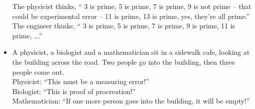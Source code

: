 \begin{itemize}
  The physicist thinks, `` 3 is prime, 5 is prime, 7 is prime, 9 is not prime --
  that could be experimental error -- 11 is prime, 13 is prime, yes, they're all
  prime.'' \\
  The engineer thinks, `` 3 is prime, 5 is prime, 7 is prime, 9 is prime, 11 is prime, ...''
 \item
  A physicist, a biologist and a mathematician sit in a sidewalk cafe, looking
  at the building across the road. Two people go into the building, then three
  people come out. \\
  Physicist: ``This must be a measuring error!'' \\
  Biologist: ``This is proof of procreation!'' \\
  Mathematician: ``If one more person goes into the building, it will be
  empty!''
\end{itemize}
